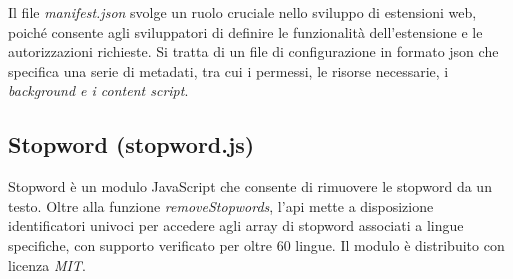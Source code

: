 \par Il file \textit{manifest.json} svolge un ruolo cruciale nello sviluppo di estensioni web, poiché consente agli sviluppatori di definire le funzionalità dell’estensione e le autorizzazioni richieste. Si tratta di un file di configurazione in formato \gls{json} che specifica una serie di metadati, tra cui i permessi, le risorse necessarie, i \textit{background e i content script}.

\subsection*{Stopword (stopword.js)}

\par Stopword è un modulo JavaScript che consente di rimuovere le \gls{stopword} da un testo. Oltre alla funzione \textit{removeStopwords}, l’\gls{api} mette a disposizione identificatori univoci per accedere agli array di \gls{stopword} associati a lingue specifiche, con supporto verificato per oltre 60 lingue. Il modulo è distribuito con licenza \textit{MIT}.